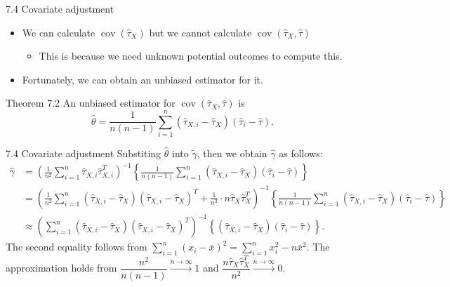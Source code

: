 \documentclass[aspectratio=169, 12pt]{beamer}
\begin{document}
\begin{frame}{7.4 Covariate adjustment}
    \begin{itemize}
        \item We can calculate $\operatorname{cov}(\hat{\tau}_X)$ but we cannot calculate $\operatorname{cov}(\hat{\tau}_X, \hat{\tau})$
        \begin{itemize}
            \item This is because we need unknown potential outcomes to compute this.
        \end{itemize}
        \item Fortunately, we can obtain an unbiased estimator for it.
    \end{itemize}
    \vspace{0.7cm}
    \begin{keybox}{Theorem 7.2}
        An unbiased estimator for $\operatorname{cov}(\hat{\tau}_X,\hat{\tau})$ is
        \[
        \hat{\theta} = \frac{1}{n(n-1)}\sum_{i=1}^{n}(\hat{\tau}_{X,i}-\hat{\tau}_X)(\hat{\tau}_{i}-\hat{\tau}).
        \]
    \end{keybox}
\end{frame}

\begin{frame}{7.4 Covariate adjustment}
    \small
    Substiting $\hat{\theta}$ into $\tilde{\gamma}$, then we obtain $\hat{\gamma}$ as follows:
    \begin{align*}
        \hat{\gamma}
        &= \left(\frac{1}{n^2}\sum_{i=1}^{n}\hat{\tau}_{X,i}\hat{\tau}_{X,i}^T\right)^{-1}\left\{\frac{1}{n(n-1)}\sum_{i=1}^{n}(\hat{\tau}_{X,i}-\hat{\tau}_X)(\hat{\tau}_{i}-\hat{\tau})\right\}\\
        &= \left(\frac{1}{n^2}\sum_{i=1}^{n}(\hat{\tau}_{X,i}-\hat{\tau}_X)(\hat{\tau}_{X,i}-\hat{\tau}_X)^T + \frac{1}{n^2}\cdot n\hat{\tau}_X\hat{\tau}_X^T\right)^{-1}\left\{\frac{1}{n(n-1)}\sum_{i=1}^{n}(\hat{\tau}_{X,i}-\hat{\tau}_X)(\hat{\tau}_{i}-\hat{\tau})\right\}\\
        &\approx \left(\sum_{i=1}^{n}(\hat{\tau}_{X,i}-\hat{\tau}_X)(\hat{\tau}_{X,i}-\hat{\tau}_X)^T\right)^{-1}\left\{(\hat{\tau}_{X,i}-\hat{\tau}_X)(\hat{\tau}_{i}-\hat{\tau})\right\}.
    \end{align*}
    The second equality follows from $\sum_{i=1}^{n}(x_i-\bar{x})^2=\sum_{i=1}^{n}x_i^2-n\bar{x}^2$. The approximation holds from $\dfrac{n^2}{n(n-1)}\xrightarrow{n\to\infty}1$ and $\dfrac{n\hat{\tau}_X\hat{\tau}_X^T}{n^2}\xrightarrow{n\to\infty}0$.
\end{frame}
\end{document}
